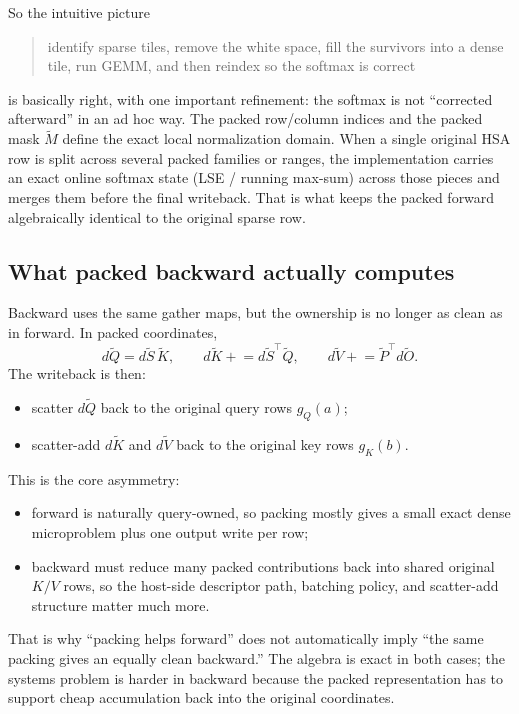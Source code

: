 \documentclass[11pt]{article}
\begin{document}
So the intuitive picture
\begin{quote}
identify sparse tiles, remove the white space, fill the survivors into a dense
tile, run GEMM, and then reindex so the softmax is correct
\end{quote}
is basically right, with one important refinement: the softmax is not
``corrected afterward'' in an ad hoc way. The packed row/column indices and the
packed mask \(\widetilde M\) define the exact local normalization domain. When a
single original HSA row is split across several packed families or ranges, the
implementation carries an exact online softmax state (LSE / running max-sum)
across those pieces and merges them before the final writeback. That is what
keeps the packed forward algebraically identical to the original sparse row.

\subsection{What packed backward actually computes}

Backward uses the same gather maps, but the ownership is no longer as clean as
in forward. In packed coordinates,
\[
d\widetilde Q = d\widetilde S\,\widetilde K,\qquad
d\widetilde K \mathrel{+}= d\widetilde S^\top \widetilde Q,\qquad
d\widetilde V \mathrel{+}= \widetilde P^\top d\widetilde O.
\]
The writeback is then:
\begin{itemize}[leftmargin=1.5em]
    \item scatter \(d\widetilde Q\) back to the original query rows \(g_Q(a)\);
    \item scatter-add \(d\widetilde K\) and \(d\widetilde V\) back to the
    original key rows \(g_K(b)\).
\end{itemize}

This is the core asymmetry:
\begin{itemize}[leftmargin=1.5em]
    \item forward is naturally query-owned, so packing mostly gives a small
    exact dense microproblem plus one output write per row;
    \item backward must reduce many packed contributions back into shared
    original \(K/V\) rows, so the host-side descriptor path, batching policy,
    and scatter-add structure matter much more.
\end{itemize}

That is why ``packing helps forward'' does not automatically imply ``the same
packing gives an equally clean backward.'' The algebra is exact in both cases;
the systems problem is harder in backward because the packed representation has
to support cheap accumulation back into the original coordinates.
\end{document}
